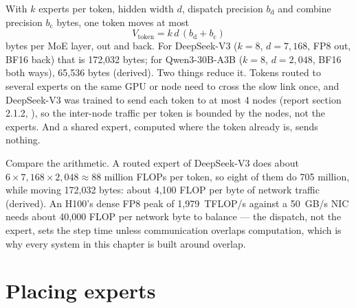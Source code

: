 

With $k$ experts per token, hidden width $d$, dispatch precision $b_{\text{d}}$
and combine precision $b_{\text{c}}$ bytes, one token moves at most
\begin{equation}
V_{\text{token}} = k\,d\,(b_{\text{d}} + b_{\text{c}})
\label{eq:ep-bytes}
\end{equation}
bytes per MoE layer, out and back. For DeepSeek-V3 ($k = 8$, $d = 7{,}168$, FP8
out, BF16 back) that is 172,032 bytes; for Qwen3-30B-A3B ($k = 8$, $d = 2{,}048$,
BF16 both ways), 65,536 bytes (derived). Two things reduce it. Tokens routed to
several experts on the same GPU or node need to cross the slow link once, and
DeepSeek-V3 was trained to send each token to at most 4 nodes (report section
2.1.2, \cite{deepseek2024v3}), so the inter-node traffic per token is bounded by
the nodes, not the experts. And a shared expert, computed where the token
already is, sends nothing.

Compare the arithmetic. A routed expert of DeepSeek-V3 does about $6 \times
7{,}168 \times 2{,}048 \approx 88$ million FLOPs per token, so eight of them do
705 million, while moving 172,032 bytes: about 4,100 FLOP per byte of network
traffic (derived). An H100's dense FP8 peak of 1,979~TFLOP/s against a 50~GB/s
NIC needs about 40,000 FLOP per network byte to balance --- the dispatch, not the expert, sets
the step time unless communication overlaps computation, which is why every
system in this chapter is built around overlap.

\section{Placing experts}

